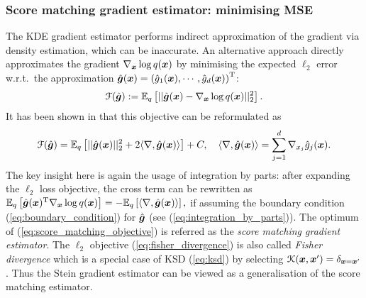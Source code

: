 \subsubsection{Score matching gradient estimator: minimising MSE}
\label{sec:score_matching}
The KDE gradient estimator performs indirect approximation of the gradient via density estimation, which can be inaccurate. An alternative approach directly approximates the gradient $\nabla_{\bm{x}} \log q(\bm{x})$ by minimising the expected $\ell_2$ error w.r.t.~the approximation $\hat{\bm{g}}(\bm{x}) = \left(\hat{g}_1(\bm{x}), \cdots, \hat{g}_d(\bm{x}) \right)^{\text{T}}$:
\begin{equation}
\mathcal{F}(\hat{\bm{g}}) := \mathbb{E}_{q} \left[ || \hat{\bm{g}}(\bm{x}) - \nabla_{\bm{x}} \log q(\bm{x}) ||_2^2 \right].
\label{eq:fisher_divergence}
\end{equation}
It has been shown in \cite{hyvarinen:score2005} that this objective can be reformulated as
\begin{equation}
\mathcal{F}(\hat{\bm{g}}) = \mathbb{E}_{q} \left[ || \hat{\bm{g}}(\bm{x}) ||_2^2 + 2 \langle \nabla, \hat{\bm{g}}(\bm{x}) \rangle \right] + C, \quad \langle \nabla, \hat{\bm{g}}(\bm{x}) \rangle = \sum_{j=1}^d \nabla_{x_j} \hat{g}_j(\bm{x}).
\label{eq:score_matching_objective}
\end{equation}
The key insight here is again the usage of integration by parts: after expanding the $\ell_2$ loss objective, the cross term can be rewritten as
$\mathbb{E}_q \left[ \hat{\bm{g}}(\bm{x})^{\text{T}} \nabla_{\bm{x}} \log q(\bm{x}) \right] = -\mathbb{E}_q \left[ \langle \nabla, \hat{\bm{g}}(\bm{x}) \rangle \right],$
if assuming the boundary condition (\ref{eq:boundary_condition}) for $\hat{\bm{g}}$ (see (\ref{eq:integration_by_parts})). 
%
The optimum of (\ref{eq:score_matching_objective}) is referred as the \emph{score matching gradient estimator}. 
%
The $\ell_2$ objective (\ref{eq:fisher_divergence}) is also called \emph{Fisher divergence} \citep{johnson:itbook2004} which is a special case of KSD (\ref{eq:ksd}) by selecting $\mathcal{K}(\bm{x}, \bm{x}') = \delta_{\bm{x} = \bm{x}'}$. Thus the Stein gradient estimator can be viewed as a generalisation of the score matching estimator. 
%

